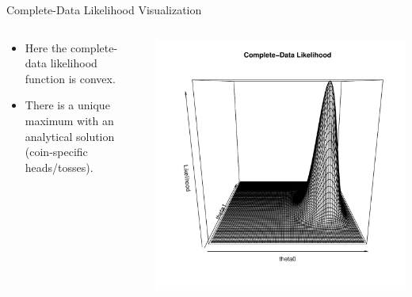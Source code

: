 \documentclass[dvipdfmx,bigger,aspectratio=169]{beamer}
\begin{document}
\begin{frame}[label={sec:org29bdff4}]{Complete-Data Likelihood Visualization}
\begin{columns}
\begin{column}{0.50\columnwidth}
\begin{itemize}
\item Here the complete-data likelihood function is convex.
\item There is a unique maximum with an analytical solution (coin-specific heads/tosses).
\end{itemize}
\end{column}

\begin{column}{0.50\columnwidth}
\scriptsize
\begin{center}
\includegraphics[page=1,keepaspectratio,width=\textwidth,height=\textheight]{./source/likelihood.pdf}
\end{center}
\normalsize
\end{column}
\end{columns}
\end{frame}
\end{document}
